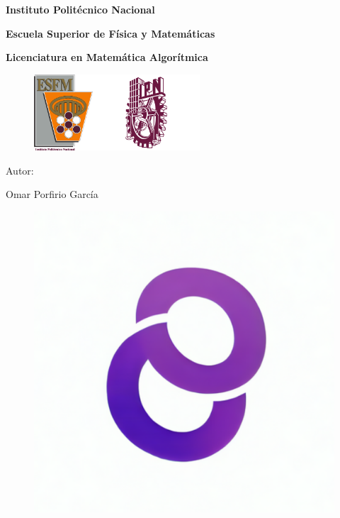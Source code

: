 

	\lstset{style = mystyle}
	\begin{titlepage}
		\centering
		
		{\bfseries\LARGE Instituto Politécnico Nacional\par}
		
		{\bfseries\Large Escuela Superior de Física y Matemáticas\par}
		
		{\bfseries\Large Licenciatura en Matemática Algorítmica\par}
		\vspace{0.5cm}
		{
			\begin{figure}[h]
				\begin{center}
					\includegraphics[width=2.2cm]{Images/Escudos/ESCUDO_ESFM.png}\includegraphics[width=4cm]{Images/Escudos/ipn2.png}\par
				\end{center}
			\end{figure}
		}
		\vspace{1cm}
		{\huge \course\par}
		\vspace{1cm}
		{\Huge \hwname\par}
		\vspace{1.5cm}
		{\Large Autor:\par}
		{\Large Omar Porfirio García\par}
		\begin{figure}[h]
			\centering
			\includegraphics[width=0.7\linewidth]{Images/Escudos/OPG.png}
		\end{figure}
	\end{titlepage}
	

